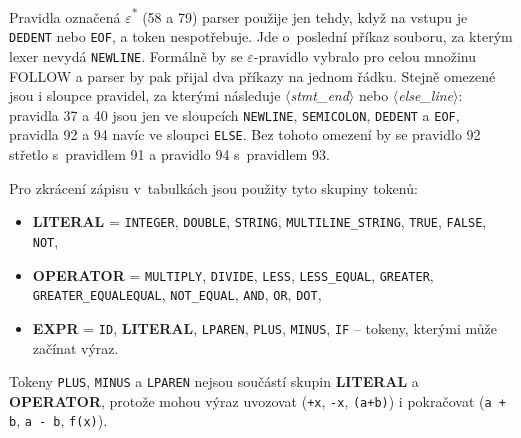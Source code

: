 \documentclass[a4paper,11pt]{article}
\newcommand{\nt}[1]{$\langle$\textit{#1}$\rangle$}   %
\newcommand{\tk}[1]{\texttt{#1}}                     %
\newcommand{\grp}[1]{\textsf{\textbf{#1}}}           %
\begin{document}
Pravidla označená $\varepsilon$\textsuperscript{*} (58 a 79) parser použije jen tehdy, když na vstupu je \tk{DEDENT} nebo \tk{EOF}, a token nespotřebuje. Jde o~poslední příkaz souboru, za kterým lexer nevydá \tk{NEWLINE}. Formálně by se $\varepsilon$-pravidlo vybralo pro celou množinu FOLLOW a parser by pak přijal dva příkazy na jednom řádku. Stejně omezené jsou i sloupce pravidel, za kterými následuje \nt{stmt\_end} nebo \nt{else\_line}: pravidla 37 a 40 jsou jen ve sloupcích \tk{NEWLINE}, \tk{SEMICOLON}, \tk{DEDENT} a \tk{EOF}, pravidla 92 a 94 navíc ve sloupci \tk{ELSE}. Bez tohoto omezení by se pravidlo 92 střetlo s~pravidlem 91 a pravidlo 94 s~pravidlem 93.

Pro zkrácení zápisu v~tabulkách jsou použity tyto skupiny tokenů:

\begin{itemize}
    \item \grp{LITERAL} = \tk{INTEGER}, \tk{DOUBLE}, \tk{STRING}, \tk{MULTILINE\_STRING}, \tk{TRUE}, \tk{FALSE}, \tk{NOT},
    \item \grp{OPERATOR} = \tk{MULTIPLY}, \tk{DIVIDE}, \tk{LESS}, \tk{LESS\_EQUAL}, \tk{GREATER}, \tk{GREATER\_EQUAL}\tk{EQUAL}, \tk{NOT\_EQUAL}, \tk{AND}, \tk{OR}, \tk{DOT},
    \item \grp{EXPR} = \tk{ID}, \grp{LITERAL}, \tk{LPAREN}, \tk{PLUS}, \tk{MINUS}, \tk{IF} -- tokeny, kterými může začínat výraz.
\end{itemize}
Tokeny \tk{PLUS}, \tk{MINUS} a \tk{LPAREN} nejsou součástí skupin \grp{LITERAL} a \grp{OPERATOR}, protože mohou výraz uvozovat (\texttt{+x}, \texttt{-x}, \texttt{(a+b)}) i pokračovat (\texttt{a + b}, \texttt{a - b}, \texttt{f(x)}).
\end{document}
